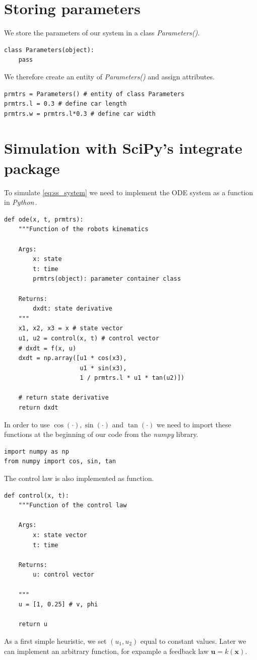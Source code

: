 \documentclass{article}
\newcommand{\py}{\emph{Python}\,}
\begin{document}
\section{Storing parameters}
We store the parameters of our system in a class \emph{Parameters()}.
\begin{lstlisting}
class Parameters(object):
    pass
\end{lstlisting}
We therefore create an entity of \emph{Parameters()} and assign attributes.
\begin{lstlisting}
prmtrs = Parameters() # entity of class Parameters
prmtrs.l = 0.3 # define car length
prmtrs.w = prmtrs.l*0.3 # define car width
\end{lstlisting}
\section{Simulation with SciPy's integrate package}
\label{sec:simulation}
To simulate \eqref{eq:ss_system} we need to implement the ODE system as a function in \py.
\begin{lstlisting}
def ode(x, t, prmtrs):
    """Function of the robots kinematics

    Args:
        x: state
        t: time
        prmtrs(object): parameter container class

    Returns:
        dxdt: state derivative
    """
    x1, x2, x3 = x # state vector
    u1, u2 = control(x, t) # control vector
    # dxdt = f(x, u)
    dxdt = np.array([u1 * cos(x3),
                     u1 * sin(x3),
                     1 / prmtrs.l * u1 * tan(u2)])

    # return state derivative
    return dxdt
\end{lstlisting}
In order to use $\cos(\cdot), \sin(\cdot)$ and $\tan(\cdot)$ we need to import these functions at the beginning of our code from the \emph{numpy} library.
\begin{lstlisting}
import numpy as np 
from numpy import cos, sin, tan
\end{lstlisting}
The control law is also implemented as function.
\begin{lstlisting}
def control(x, t):
    """Function of the control law

    Args:
        x: state vector
        t: time

    Returns:
        u: control vector

    """
    u = [1, 0.25] # v, phi
    
    return u
\end{lstlisting}
As a first simple heuristic, we set $(u_1, u_2)$ equal to constant values. Later we can implement an arbitrary function, for expample a feedback law $\mathbf{u}=k(\mathbf{x})$.
\end{document}
